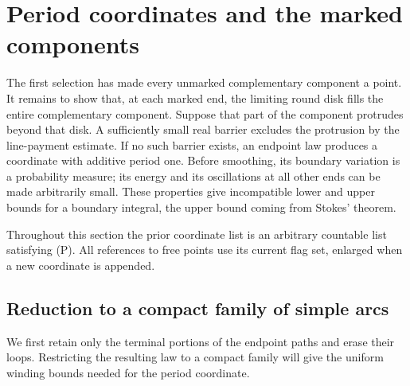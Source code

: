\section{Period coordinates and the marked components}\label{sec:streams}

The first selection has made every unmarked complementary component a
point.  It remains to show that, at each marked end, the limiting round
disk fills the entire complementary component.  Suppose that part of the
component protrudes beyond that disk.  A sufficiently small real barrier
excludes the protrusion by the line-payment estimate.  If no such barrier
exists, an endpoint law produces a coordinate with additive period one.
Before smoothing, its boundary variation is a probability measure; its
energy and its oscillations at all other ends can be made arbitrarily
small.  These properties give incompatible lower and upper bounds for a
boundary integral, the upper bound coming from Stokes' theorem.

Throughout this section the prior coordinate list is an arbitrary
countable list satisfying (P).  All references to free points use its
current flag set, enlarged when a new coordinate is appended.

\subsection{Reduction to a compact family of simple arcs}

We first retain only the terminal portions of the endpoint paths and
erase their loops.  Restricting the resulting law to a compact family
will give the uniform winding bounds needed for the period coordinate.

